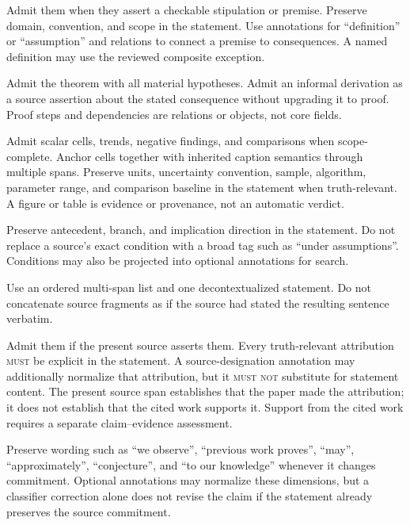 \begin{description}[style=nextline]
  \item[Definitions and assumptions.] Admit them when they assert a checkable stipulation or premise. Preserve domain, convention, and scope in the statement. Use annotations for ``definition'' or ``assumption'' and relations to connect a premise to consequences. A named definition may use the reviewed composite exception.

  \item[Theorems and informal derivations.] Admit the theorem with all material hypotheses. Admit an informal derivation as a source assertion about the stated consequence without upgrading it to proof. Proof steps and dependencies are relations or \MathClaimIR{} objects, not core fields.

  \item[Numerical, table, and figure claims.] Admit scalar cells, trends, negative findings, and comparisons when scope-complete. Anchor cells together with inherited caption semantics through multiple spans. Preserve units, uncertainty convention, sample, algorithm, parameter range, and comparison baseline in the statement when truth-relevant. A figure or table is evidence or provenance, not an automatic verdict.

  \item[Conditional claims.] Preserve antecedent, branch, and implication direction in the statement. Do not replace a source's exact condition with a broad tag such as ``under assumptions''. Conditions may also be projected into optional annotations for search.

  \item[Cross-sentence and cross-section claims.] Use an ordered multi-span list and one decontextualized statement. Do not concatenate source fragments as if the source had stated the resulting sentence verbatim.

  \item[Cited and background claims.] Admit them if the present source asserts them. Every truth-relevant attribution \textsc{must} be explicit in the statement. A source-designation annotation may additionally normalize that attribution, but it \textsc{must not} substitute for statement content. The present source span establishes that the paper made the attribution; it does not establish that the cited work supports it. Support from the cited work requires a separate claim--evidence assessment.

  \item[Attribution and modality.] Preserve wording such as ``we observe'', ``previous work proves'', ``may'', ``approximately'', ``conjecture'', and ``to our knowledge'' whenever it changes commitment. Optional annotations may normalize these dimensions, but a classifier correction alone does not revise the claim if the statement already preserves the source commitment.


\end{description}
